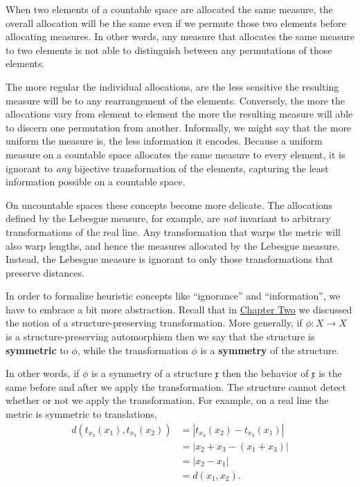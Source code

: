 \documentclass[
  letterpaper,
  DIV=11,
  numbers=noendperiod]{scrartcl}
\begin{document}
When two elements of a countable space are allocated the same measure,
the overall allocation will be the same even if we permute those two
elements before allocating measures. In other words, any measure that
allocates the same measure to two elements is not able to distinguish
between any permutations of those elements.

The more regular the individual allocations, are the less sensitive the
resulting measure will be to any rearrangement of the elements.
Conversely, the more the allocations vary from element to element the
more the resulting measure will able to discern one permutation from
another. Informally, we might say that the more uniform the measure is,
the less information it encodes. Because a uniform measure on a
countable space allocates the same measure to every element, it is
ignorant to \emph{any} bijective transformation of the elements,
capturing the least information possible on a countable space.

On uncountable spaces these concepts become more delicate. The
allocations defined by the Lebesgue measure, for example, are \emph{not}
invariant to arbitrary transformations of the real line. Any
transformation that warps the metric will also warp lengths, and hence
the measures allocated by the Lebesgue measure. Instead, the Lebesgue
measure is ignorant to only those transformations that preserve
distances.

In order to formalize heuristic concepts like ``ignorance'' and
``information'', we have to embrace a bit more abstraction. Recall that
in
\href{http://www.symplectomorphic.com/assets/chapters_html/spaces.html}{Chapter
Two} we discussed the notion of a structure-preserving transformation.
More generally, if \(\phi : X \rightarrow X\) is a structure-preserving
automorphism then we say that the structure is \textbf{symmetric} to
\(\phi\), while the transformation \(\phi\) is a \textbf{symmetry} of
the structure.

In other words, if \(\phi\) is a symmetry of a structure
\(\mathfrak{x}\) then the behavior of \(\mathfrak{x}\) is the same
before and after we apply the transformation. The structure cannot
detect whether or not we apply the transformation. For example, on a
real line the metric is symmetric to translations, \begin{align*}
d( t_{x_{3}}(x_{1}), t_{x_{3}}(x_{2}) )
&=
| t_{x_{3}}(x_{2}) - t_{x_{3}}(x_{1}) |
\\
&=
| x_{2} + x_{3} - (x_{1} + x_{3}) |
\\
&=
| x_{2} - x_{1} |
\\
&=
d(x_{1}, x_{2}).
\end{align*}
\end{document}
